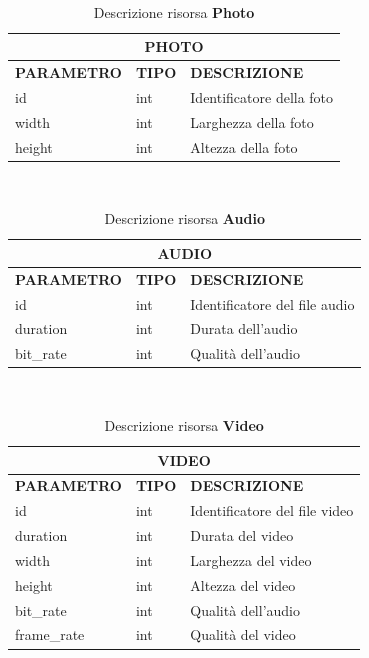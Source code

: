 \ \linebreak
\begin{table}[!h]
\centering
	\begin{tabular}{@{}lll@{}}
		\toprule
		\multicolumn{3}{c}{\textbf{PHOTO}}                             \\ \midrule
		\textbf{PARAMETRO} & \textbf{TIPO} & \textbf{DESCRIZIONE}      \\
		id                 & int           & Identificatore della foto \\
		width              & int           & Larghezza della foto      \\
		height             & int           & Altezza della foto        \\ \bottomrule
	\end{tabular}
\caption{Descrizione risorsa \textbf{Photo}}\label{etichetta}
\end{table}

\ \linebreak
\begin{table}[!h]
\centering
	\begin{tabular}{@{}lll@{}}
		\toprule
		\multicolumn{3}{c}{\textbf{AUDIO}}                                 \\ \midrule
		\textbf{PARAMETRO} & \textbf{TIPO} & \textbf{DESCRIZIONE}          \\
		id                 & int           & Identificatore del file audio \\
		duration           & int           & Durata dell'audio             \\
		bit\_rate          & int           & Qualità dell'audio            \\ \bottomrule
	\end{tabular}
\caption{Descrizione risorsa \textbf{Audio}}\label{etichetta}
\end{table}

\ \linebreak
\begin{table}[!h]
\centering
	\begin{tabular}{@{}lll@{}}
		\toprule
		\multicolumn{3}{c}{\textbf{VIDEO}}                                 \\ \midrule
		\textbf{PARAMETRO} & \textbf{TIPO} & \textbf{DESCRIZIONE}          \\
		id                 & int           & Identificatore del file video \\
		duration           & int           & Durata del video              \\
		width              & int           & Larghezza del video           \\
		height             & int           & Altezza del video             \\
		bit\_rate          & int           & Qualità dell'audio            \\
		frame\_rate        & int           & Qualità del video             \\ \bottomrule
	\end{tabular}
\caption{Descrizione risorsa \textbf{Video}}\label{etichetta}
\end{table}



